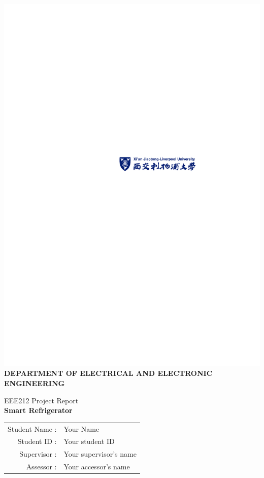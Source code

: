 \documentclass[12pt,a4paper]{report}
\begin{document}
\begin{titlepage}
\begin{center}
\includegraphics[scale=1.5]{CoverSheet}\\
\bf{ DEPARTMENT OF ELECTRICAL AND ELECTRONIC ENGINEERING }
\end{center}

\vspace{18mm}
 \begin{center}
 \begin{Large}
 {EEE212 Project Report}\\ 
 \vspace{2.0cm}
 \bf{Smart Refrigerator}
 \end{Large}
 \end{center} 
\vspace{2.0cm}

  \begin{center}
  \begin{large}
   \vspace{3.0cm}
     \begin{tabular}{r@{ }l} 
       Student Name : & Your Name\\ 
       Student ID : & Your student ID\\ 
       Supervisor : &  Your supervisor's name\\ 
       Assessor : & Your accessor's name \\
    \end{tabular}
  \end{large}
  \end{center}
\clearpage
\end{titlepage}
\end{document}
